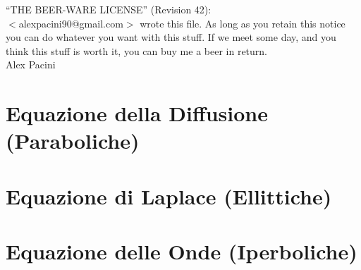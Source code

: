 \documentclass[a4paper]{report}
\begin{document}
%

%
\null
\vfill
%
	``THE BEER-WARE LICENSE'' (Revision 42): \\
	$<$alexpacini90@gmail.com$>$ wrote this file. 
	As long as you retain this notice you
	can do whatever you want with this stuff. 
	If we meet some day, and you think
	this stuff is worth it, you can buy me a beer in return.\\
	Alex Pacini
%
\newpage
\tableofcontents
\newpage
%
\chapter{Equazione della Diffusione (Paraboliche)}	\label{chap:diffusion}

%
\chapter{Equazione di Laplace (Ellittiche)}		\label{chap:laplacian}

%
\chapter{Equazione delle Onde (Iperboliche)}		\label{chap:waves}

%
\listoffigures
%
\end{document}
